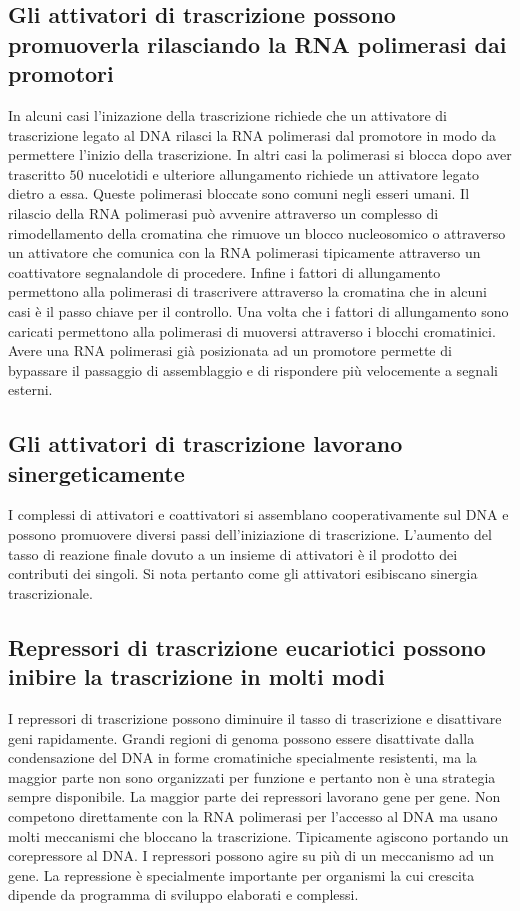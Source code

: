 \subsection{Gli attivatori di trascrizione possono promuoverla rilasciando la RNA polimerasi dai promotori}
In alcuni casi l'inizazione della trascrizione richiede che un attivatore di trascrizione legato al DNA rilasci la RNA polimerasi dal promotore in modo da permettere l'inizio della
trascrizione. In altri casi la polimerasi si blocca dopo aver trascritto $50$ nucelotidi e ulteriore allungamento richiede un attivatore legato dietro a essa. Queste polimerasi bloccate
sono comuni negli esseri umani. Il rilascio della RNA polimerasi pu\`o avvenire attraverso un complesso di rimodellamento della cromatina che rimuove un blocco nucleosomico o attraverso
un attivatore che comunica con la RNA polimerasi tipicamente attraverso un coattivatore segnalandole di procedere. Infine i fattori di allungamento permettono alla polimerasi di 
trascrivere attraverso la cromatina che in alcuni casi \`e il passo chiave per il controllo. Una volta che i fattori di allungamento sono caricati permettono alla polimerasi di muoversi
attraverso i blocchi cromatinici. Avere una RNA polimerasi gi\`a posizionata ad un promotore permette di bypassare il passaggio di assemblaggio e di rispondere pi\`u velocemente a 
segnali esterni.
\subsection{Gli attivatori di trascrizione lavorano sinergeticamente}
I complessi di attivatori e coattivatori si assemblano cooperativamente sul DNA e possono promuovere diversi passi dell'iniziazione di trascrizione. L'aumento del tasso di reazione 
finale dovuto a un insieme di attivatori \`e il prodotto dei contributi dei singoli. Si nota pertanto come gli attivatori esibiscano sinergia trascrizionale. 
\subsection{Repressori di trascrizione eucariotici possono inibire la trascrizione in molti modi}
I repressori di trascrizione possono diminuire il tasso di trascrizione e disattivare geni rapidamente. Grandi regioni di genoma possono essere disattivate dalla condensazione del DNA
in forme cromatiniche specialmente resistenti, ma la maggior parte non sono organizzati per funzione e pertanto non \`e una strategia sempre disponibile. La maggior parte dei repressori
lavorano gene per gene. Non competono direttamente con la RNA polimerasi per l'accesso al DNA ma usano molti meccanismi che bloccano la trascrizione. Tipicamente agiscono portando un
corepressore al DNA. I repressori possono agire su pi\`u di un meccanismo ad un gene. La repressione \`e specialmente importante per organismi la cui crescita dipende da programma di 
sviluppo elaborati e complessi. 
